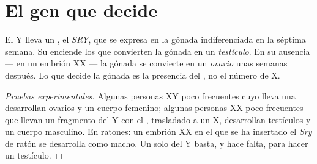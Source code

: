 \section{El gen que decide}

\begin{proposition}\label{prop:g11:becoming-male-female:sry}
El  Y lleva un , el \emph{SRY}, que se
expresa en la gónada indiferenciada en la séptima semana. Su 
enciende los  que convierten la gónada en un \emph{testículo}. En
su ausencia --- en un embrión XX --- la gónada se convierte en un
\emph{ovario} unas semanas después. Lo que decide la gónada es la
presencia del , no el número de  X.
\end{proposition}
\begin{proof}[Pruebas experimentales]
Algunas personas XY poco frecuentes cuyo  lleva una 
desarrollan ovarios y un cuerpo femenino; algunas personas XX poco
frecuentes que llevan un fragmento del Y con el , trasladado a un X,
desarrollan testículos y un cuerpo masculino. En ratones: un embrión XX
en el que se ha insertado el  \emph{Sry} de ratón se desarrolla como
macho. Un solo  del Y basta, y hace falta, para hacer un testículo.
\end{proof}

